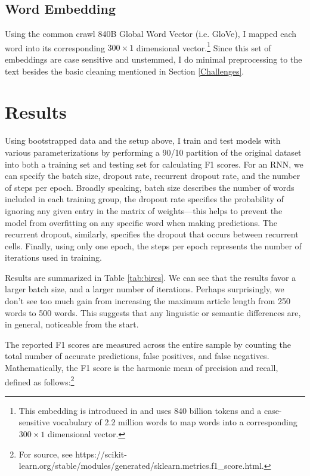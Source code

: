\documentclass{article}
\begin{document}
	\subsection{Word Embedding}
	Using the common crawl 840B Global Word Vector (i.e. GloVe), I mapped each word into its corresponding $300 \times 1$ dimensional vector.\footnote{This embedding is introduced in \citet{pennington2014glove} and uses 840 billion tokens and a case-sensitive vocabulary of 2.2 million words to map words into a corresponding $300 \times 1$ dimensional vector.} Since this set of embeddings are case sensitive and unstemmed, I do minimal preprocessing to the text besides the basic cleaning mentioned in Section \ref{Challenges}.
	
	
		
	\section{Results}
	
	Using bootstrapped data and the setup above, I train and test models with various parameterizations by performing a 90/10 partition of the original dataset into both a training set and testing set for calculating F1 scores. For an RNN, we can specify the batch size, dropout rate, recurrent dropout rate, and the number of steps per epoch. Broadly speaking, batch size describes the number of words included in each training group, the dropout rate specifies the probability of ignoring any given entry in the matrix of weights---this helps to prevent the model from overfitting on any specific word when making predictions. The recurrent dropout, similarly, specifies the dropout that occurs between recurrent cells. Finally, using only one epoch, the steps per epoch represents the number of iterations used in training. 
	
	Results are summarized in Table \ref{tab:bires}. We can see that the results favor a larger batch size, and a larger number of iterations. Perhaps surprisingly, we don't see too much gain from increasing the maximum article length from 250 words to 500 words. This suggests that any linguistic or semantic differences are, in general, noticeable from the start. 
	
	
	
	The reported F1 scores are measured across the entire sample by counting the total number of accurate predictions, false positives, and false negatives. Mathematically, the F1 score is the harmonic mean of precision and recall, defined as follows:\footnote{For source, see https://scikit-learn.org/stable/modules/generated/sklearn.metrics.f1\_score.html.} 
	
\end{document}
